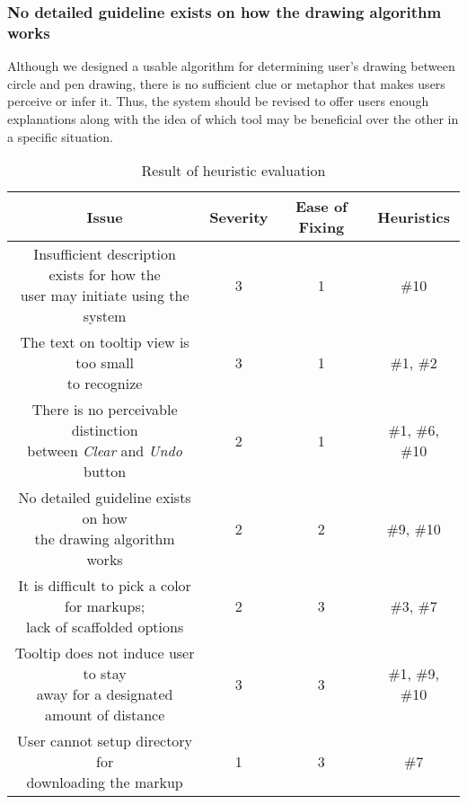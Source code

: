 \subsubsection{No detailed guideline exists on how the drawing algorithm works}

Although we designed a usable algorithm for determining user's drawing between circle and pen drawing, there is no sufficient clue or metaphor that makes users perceive or infer it. Thus, the system should be revised to offer users enough explanations along with the idea of which tool may be beneficial over the other in a specific situation.

\begin{table}[]
    \centering
    \caption{Result of heuristic evaluation}
    \vspace{0.2cm}
    \begin{tabular}{|c|c|c|c|}
        \hline
        \textbf{\small{Issue}} & \textbf{\small{Severity}} & \textbf{\small{Ease of Fixing}} & \textbf{\small{Heuristics}}\\
        \hline
        \hline \specialcell{\small{Insufficient description exists for how the}\\\small{user may initiate using the system}} & \small{3} & \small{1} & \small{\#10}\\
        \hline \specialcell{\small{The text on tooltip view is too small}\\\small{to recognize}} & \small{3} & \small{1} & \small{\#1, \#2}\\
        \hline \specialcell{\small{There is no perceivable distinction}\\\small{between \textit{Clear} and \textit{Undo} button}} & \small{2} & \small{1} & \small{\#1, \#6, \#10}\\
        \hline \specialcell{\small{No detailed guideline exists on how}\\\small{the drawing algorithm works}} & \small{2} & \small{2} & \small{\#9, \#10}\\
        \hline \specialcell{\small{It is difficult to pick a color for markups;}\\\small{lack of scaffolded options}} & \small{2} & \small{3} & \small{\#3, \#7}\\
        \hline \specialcell{\small{Tooltip does not induce user to stay}\\\small{away for a designated amount of distance}} & \small{3} & \small{3} & \small{\#1, \#9, \#10}\\
        \hline \specialcell{\small{User cannot setup directory for}\\\small{downloading the markup}} & \small{1} & \small{3} & \small{\#7}\\
        \hline
    \end{tabular}
    \label{tab:heuristics_result}
\end{table}